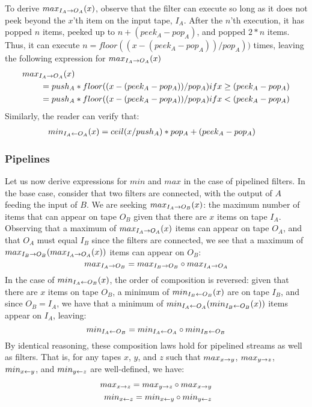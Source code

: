 To derive $max_{I_A \rightarrow O_A}(x)$, observe that the filter can execute so
long as it does not peek beyond the $x$'th item on the input tape,
$I_A$.  After the $n$'th execution, it has popped $n$ items, peeked up
to $n + (peek_A - pop_A)$, and popped $2 * n$ items.  Thus, it can
execute $n = floor((x - (peek_A - pop_A)) / pop_A))$ times, leaving
the following expression for $max_{I_A \rightarrow O_A}(x)$
\begin{eqnarray*}
max_{I_A \rightarrow O_A}(x)& \\ = push_A&*floor((x-(peek_A-pop_A))/pop_A) if x \ge (peek_A-pop_A) \\
         = push_A&*floor((x-(peek_A-pop_A))/pop_A) if x <  (peek_A-pop_A)
\end{eqnarray*}
Similarly, the reader can verify that:
\begin{eqnarray*}
min_{I_A \leftarrow O_A}(x)&= ceil(x/push_A)*pop_A+(peek_A-pop_A)
\end{eqnarray*}

\subsubsection{Pipelines}

Let us now derive expressions for $min$ and $max$ in the case of
pipelined filters.  In the base case, consider that two filters are
connected, with the output of $A$ feeding the input of $B$.  We are
seeking $max_{I_A \rightarrow O_B}(x)$: the maximum number of items that can
appear on tape $O_B$ given that there are $x$ items on tape $I_A$.
Observing that a maximum of $max_{I_A \rightarrow O_A}(x)$ items can appear on
tape $O_A$, and that $O_A$ must equal $I_B$ since the filters are
connected, we see that a maximum of
$max_{I_B \rightarrow O_B}(max_{I_A \rightarrow O_A}(x))$ items can appear on $O_B$:
\begin{equation*}
max_{I_A \rightarrow O_B} = max_{I_B \rightarrow O_B} \circ max_{I_A \rightarrow O_A}
\end{equation*}
In the case of $min_{I_A \leftarrow O_B}(x)$, the order of composition is
reversed: given that there are $x$ items on tape $O_B$, a minimum of
$min_{I_B \leftarrow O_B}(x)$ are on tape $I_B$, and since $O_B = I_A$, we have
that a minimum of $min_{I_A \leftarrow O_A}(min_{I_B \leftarrow O_B}(x))$ items appear on
$I_A$, leaving:
\begin{equation*}
min_{I_A \leftarrow O_B} = min_{I_A \leftarrow O_A} \circ min_{I_B \leftarrow O_B}
\end{equation*}
By identical reasoning, these composition laws hold for pipelined
streams as well as filters.  That is, for any tapes $x$, $y$, and $z$
such that $max_{x \rightarrow y}$, $max_{y \rightarrow z}$, $min_{x \leftarrow y}$, and $min_{y \leftarrow z}$ are
well-defined, we have:
\begin{eqnarray}
\label{eq:compose}
max_{x \rightarrow z} = max_{y \rightarrow z} \circ max_{x \rightarrow y} \\
min_{x \leftarrow z} = min_{x \leftarrow y} \circ min_{y \leftarrow z}
\end{eqnarray}

